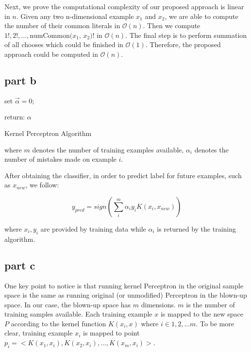 Next, we prove the computational complexity of our proposed approach is linear in $n$. Given any two n-dimensional example $x_1$ and $x_2$, we are able to compute the number of their common literals in $\mathcal{O}(n)$. Then we compute $1!, 2!, ..., \text{numCommon($x_1$, $x_2$)}!$ in $\mathcal{O}(n)$. The final step is to perform summation of all chooses which could be finished in $\mathcal{O}(1)$. Therefore, the proposed approach could be computed in $\mathcal{O}(n)$.


\subsection{part b}

\begin{algorithm}[H]
  set $\vec{\alpha}=0$;



return: $\alpha$\;

 \caption{Kernel Perceptron Algorithm}
\end{algorithm}

where $m$ denotes the number of training examples available, $\alpha_i$ denotes the number of mistakes made on example $i$.

After obtaining the classifier, in order to predict label for future examples, such as $x_{new}$, we follow:

\begin{equation}
y_{pred} = sign(\sum_{i}^{m} \alpha_i y_i K(x_i, x_{new}))
\end{equation}

where $x_i, y_i$ are provided by training data while $\alpha_i$ is returned by the training algorithm.

\subsection{part c}

One key point to notice is that running kernel Perceptron in the original sample space is the same as running original (or unmodified) Perceptron in the blown-up space. In our case, the blown-up space has $m$ dimensions. $m$ is the number of training samples available. Each training example $x$ is mapped to the new space $P$ according to the kernel function $K(x_i,x)$ where $i \in 1,2,...m$. To be more clear, training example $x_i$ is mapped to point $p_i = <K(x_1,x_i), K(x_2,x_i), ..., K(x_m, x_i)>$.

